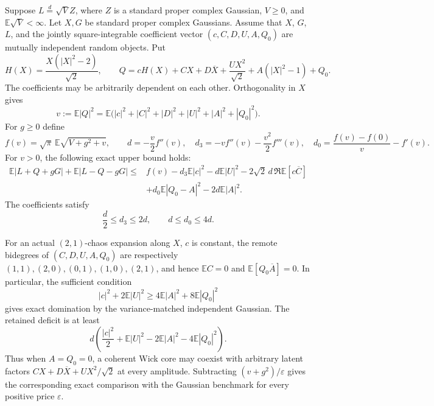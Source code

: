 Suppose $L\overset d=\sqrt V Z$, where $Z$ is a standard proper complex Gaussian,
$V\ge0$, and $\mathbb E\sqrt V<\infty$. Let $X,G$ be standard proper complex
Gaussians. Assume that $X$, $G$, $L$, and the jointly square-integrable
coefficient vector $(c,C,D,U,A,Q_0)$ are mutually independent random objects. Put
\[
 H(X)=\frac{X(|X|^2-2)}{\sqrt2},\qquad
 Q=cH(X)+CX+D\overline X+\frac{UX^2}{\sqrt2}
          +A(|X|^2-1)+Q_0.
\]
The coefficients may be arbitrarily dependent on each other. Orthogonality in
$X$ gives
\[
 v:=\mathbb E|Q|^2
 =\mathbb E\bigl(|c|^2+|C|^2+|D|^2+|U|^2+|A|^2+|Q_0|^2\bigr).
\]
For $g\ge0$ define
\[
 f(v)=\sqrt\pi\,\mathbb E\sqrt{V+g^2+v},\qquad
 d=-\frac v2f''(v),\quad
 d_3=-vf''(v)-\frac{v^2}2f'''(v),\quad
 d_0=\frac{f(v)-f(0)}v-f'(v).
\]
For $v>0$, the following exact upper bound holds:
\begin{equation}\label{eq:remote-core-factor-exact}
\begin{split}
 \mathbb E|L+Q+gG|+\mathbb E|L-Q-gG|
 \le{}& f(v)-d_3\mathbb E|c|^2-d\mathbb E|U|^2
           -2\sqrt2\,d\,\Re\mathbb E[c\overline C]\\
      &+d_0\mathbb E|Q_0-A|^2-2d\mathbb E|A|^2.
\end{split}
\end{equation}
The coefficients satisfy
\begin{equation}\label{eq:remote-core-factor-ranges}
 \frac d2\le d_3\le2d,\qquad d\le d_0\le4d.
\end{equation}

For an actual $(2,1)$-chaos expansion along $X$, $c$ is constant, the remote
bidegrees of $(C,D,U,A,Q_0)$ are respectively
$(1,1),(2,0),(0,1),(1,0),(2,1)$, and hence
$\mathbb EC=0$ and $\mathbb E[Q_0\overline A]=0$.
In particular, the sufficient condition
\begin{equation}\label{eq:remote-core-factor-cone}
 |c|^2+2\mathbb E|U|^2\ge4\mathbb E|A|^2+8\mathbb E|Q_0|^2
\end{equation}
gives exact domination by the variance-matched independent Gaussian. The
retained deficit is at least
\[
 d\left(\frac{|c|^2}2+\mathbb E|U|^2
       -2\mathbb E|A|^2-4\mathbb E|Q_0|^2\right).
\]
Thus when $A=Q_0=0$, a coherent Wick core may coexist with arbitrary latent
factors $CX+D\overline X+UX^2/\sqrt2$ at every amplitude. Subtracting
$(v+g^2)/\varepsilon$ gives the corresponding exact comparison with the
Gaussian benchmark for every positive price $\varepsilon$.

